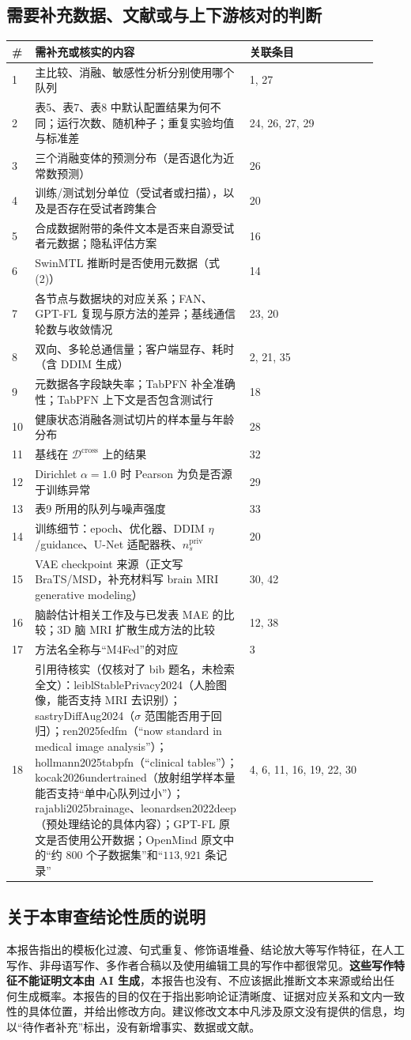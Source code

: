 \documentclass[11pt,a4paper]{ctexart}
\begin{document}
\subsection{需要补充数据、文献或与上下游核对的判断}
\begin{longtable}{p{0.04\linewidth}p{0.55\linewidth}p{0.33\linewidth}}
\toprule
\# & 需补充或核实的内容 & 关联条目 \\
\midrule
1 & 主比较、消融、敏感性分析分别使用哪个队列 & 1, 27 \\
2 & 表5、表7、表8 中默认配置结果为何不同；运行次数、随机种子；重复实验均值与标准差 & 24, 26, 27, 29 \\
3 & 三个消融变体的预测分布（是否退化为近常数预测） & 26 \\
4 & 训练/测试划分单位（受试者或扫描），以及是否存在受试者跨集合 & 20 \\
5 & 合成数据附带的条件文本是否来自源受试者元数据；隐私评估方案 & 16 \\
6 & SwinMTL 推断时是否使用元数据（式(2)） & 14 \\
7 & 各节点与数据块的对应关系；FAN、GPT-FL 复现与原方法的差异；基线通信轮数与收敛情况 & 23, 20 \\
8 & 双向、多轮总通信量；客户端显存、耗时（含 DDIM 生成） & 2, 21, 35 \\
9 & 元数据各字段缺失率；TabPFN 补全准确性；TabPFN 上下文是否包含测试行 & 18 \\
10 & 健康状态消融各测试切片的样本量与年龄分布 & 28 \\
11 & 基线在 $\mathcal{D}^{\mathrm{cross}}$ 上的结果 & 32 \\
12 & Dirichlet $\alpha=1.0$ 时 Pearson 为负是否源于训练异常 & 29 \\
13 & 表9 所用的队列与噪声强度 & 33 \\
14 & 训练细节：epoch、优化器、DDIM $\eta$/guidance、U-Net 适配器秩、$n_s^{\mathrm{priv}}$ & 20 \\
15 & VAE checkpoint 来源（正文写 BraTS/MSD，补充材料写 brain MRI generative modeling） & 30, 42 \\
16 & 脑龄估计相关工作及与已发表 MAE 的比较；3D 脑 MRI 扩散生成方法的比较 & 12, 38 \\
17 & 方法名全称与“M4Fed”的对应 & 3 \\
18 & 引用待核实（仅核对了 bib 题名，未检索全文）：leiblStablePrivacy2024（人脸图像，能否支持 MRI 去识别）；sastryDiffAug2024（$\sigma$ 范围能否用于回归）；ren2025fedfm（“now standard in medical image analysis”）；hollmann2025tabpfn（“clinical tables”）；kocak2026undertrained（放射组学样本量能否支持“单中心队列过小”）；rajabli2025brainage、leonardsen2022deep（预处理结论的具体内容）；GPT-FL 原文是否使用公开数据；OpenMind 原文中的“约 800 个子数据集”和“$113{,}921$ 条记录” & 4, 6, 11, 16, 19, 22, 30 \\
\bottomrule
\end{longtable}

\subsection{关于本审查结论性质的说明}
本报告指出的模板化过渡、句式重复、修饰语堆叠、结论放大等写作特征，在人工写作、非母语写作、多作者合稿以及使用编辑工具的写作中都很常见。\textbf{这些写作特征不能证明文本由 AI 生成}，本报告也没有、不应该据此推断文本来源或给出任何生成概率。本报告的目的仅在于指出影响论证清晰度、证据对应关系和文内一致性的具体位置，并给出修改方向。建议修改文本中凡涉及原文没有提供的信息，均以“待作者补充”标出，没有新增事实、数据或文献。
\end{document}
